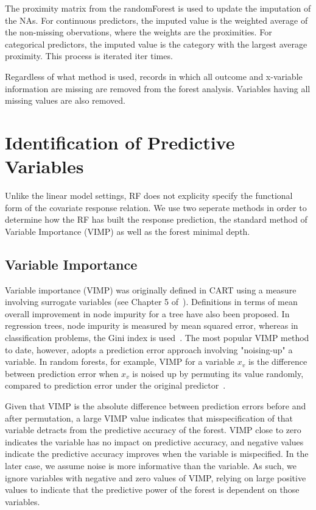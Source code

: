 \documentclass[nojss]{jss}\usepackage[]{graphicx}\usepackage[]{color}
\begin{document}
The proximity matrix from the randomForest is used to update the imputation of the NAs. For continuous predictors, the imputed value is the weighted average of the non-missing obervations, where the weights are the proximities. For categorical predictors, the imputed value is the category with the largest average proximity. This process is iterated iter times.

Regardless of what method is used, records in which all outcome and x-variable information are missing are removed from the forest analysis. Variables having all missing values are also removed.

\section{Identification of Predictive Variables}
Unlike the linear model settings, RF does not explicity specify the functional form of the covariate response relation. We use two seperate methods in order to determine how the RF has built the response prediction, the standard method of Variable Importance (VIMP) as well as the forest minimal depth.


\subsection{Variable Importance}\label{S:vimp}
Variable importance (VIMP) was originally defined in CART using a measure involving surrogate variables (see Chapter 5 of~\cite{cart:1984}). Definitions in terms of mean overall improvement in node impurity for a tree have also been proposed. In regression trees, node impurity is measured by mean squared error, whereas in classification problems, the Gini index is used~\citep{FriedmanGreedyfunction:2000}. The most popular VIMP method to date, however, adopts a prediction error approach involving "noising-up" a variable. In random forests, for example, VIMP for a variable $x_v$ is the difference between prediction error when $x_v$ is noised up by permuting its value randomly, compared to prediction error under the original predictor~\citep{Breiman:2001,liaw:2002,Ishwaran:2007,Ishwaran:2008}.

Given that VIMP is the absolute difference between prediction errors before and after permutation, a large VIMP value indicates that misspecification of that variable detracts from the predictive accuracy of the forest. VIMP close to zero indicates the variable has no impact on predictive accuracy, and negative values indicate the predictive accuracy improves when the variable is mispecified. In the later case, we assume noise is more informative than the variable. As such, we ignore variables with negative and zero values of VIMP, relying on large positive values to indicate that the predictive power of the forest is dependent on those variables. 
\end{document}

